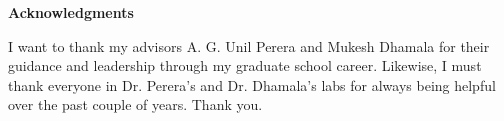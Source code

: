 {}
\begin{doublespace}
  \begin{center}
    \textbf{Acknowledgments}
  \end{center}
  I want to thank my advisors A. G. Unil Perera and Mukesh Dhamala for their guidance and leadership through my graduate school career.  Likewise, I must thank everyone in Dr. Perera's and Dr. Dhamala's labs for always being helpful over the past couple of years.  Thank you.
\end{doublespace}